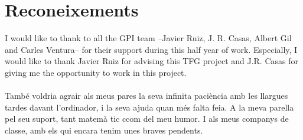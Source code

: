 \chapter*{Reconeixements}
I would like to thank to all the GPI team --Javier Ruiz, J. R. Casas, Albert Gil and Carles Ventura-- for their support during this half year of work. Especially, I would like to thank Javier Ruiz for advising this TFG project and J.R. Casas for giving me the opportunity to work in this project.
\\ \\

Tamb\'e voldria agrair als meus pares la seva infinita paci\`encia amb les llargues tardes davant l'ordinador, i la seva ajuda quan m\'es falta feia. A la meva parella pel seu suport, tant matem\`a	tic ccom del meu humor. I als meus companys de classe, amb els qui encara tenim unes braves pendents.